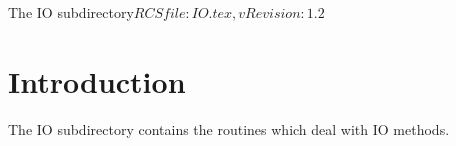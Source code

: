 %   

\begin{cactuspart}{7}{The IO subdirectory}{$RCSfile: IO.tex,v $}{$Revision: 1.2 $}
\renewcommand{\thepage}{\Alph{part}\arabic{page}}

\chapter{Introduction}

The IO subdirectory contains the routines which deal with IO methods.

\end{cactuspart}
